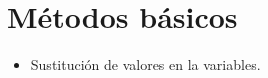 \section{\large Métodos básicos}

\begin{itemize}
    \item Sustitución de valores en la variables.
\end{itemize}
